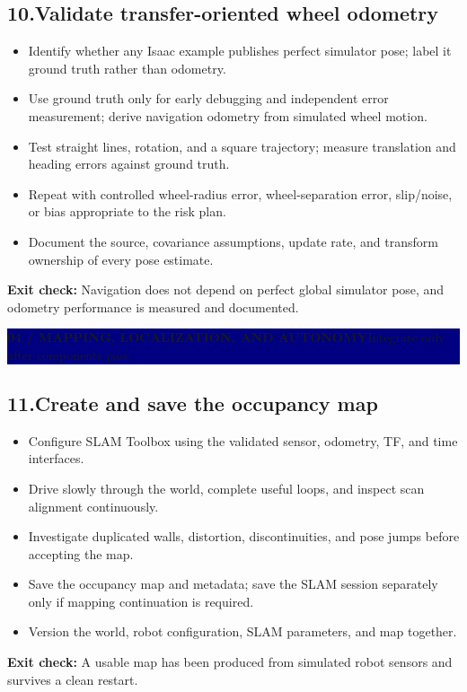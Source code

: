 \documentclass[10pt,a4paper]{article}
\newcommand{\cb}{\(\square\)}
\newcommand{\exitcheck}[1]{\vspace{2pt}\colorbox{PaleTeal}{\parbox{0.965\linewidth}{\textbf{Exit check:} #1}}}
\newcommand{\workstep}[2]{\subsection{\texorpdfstring{#1\quad #2}{#1\ #2}}}
\newcommand{\stagebanner}[2]{%
  \vspace{2pt}
  \noindent\colorbox{Navy}{\parbox{0.965\linewidth}{\color{white}\textbf{#1}\hfill #2}}
  \vspace{2pt}
}
\begin{document}
\workstep{10.}{Validate transfer-oriented wheel odometry}
\begin{itemize}
  \item[\cb] Identify whether any Isaac example publishes perfect simulator pose; label it ground truth rather than odometry.
  \item[\cb] Use ground truth only for early debugging and independent error measurement; derive navigation odometry from simulated wheel motion.
  \item[\cb] Test straight lines, rotation, and a square trajectory; measure translation and heading errors against ground truth.
  \item[\cb] Repeat with controlled wheel-radius error, wheel-separation error, slip/noise, or bias appropriate to the risk plan.
  \item[\cb] Document the source, covariance assumptions, update rate, and transform ownership of every pose estimate.
\end{itemize}
\exitcheck{Navigation does not depend on perfect global simulator pose, and odometry performance is measured and documented.}

\newpage
\stagebanner{04 / MAPPING, LOCALIZATION, AND AUTONOMY}{Integrate only after components pass}

\workstep{11.}{Create and save the occupancy map}
\begin{itemize}
  \item[\cb] Configure SLAM Toolbox using the validated sensor, odometry, TF, and time interfaces.
  \item[\cb] Drive slowly through the world, complete useful loops, and inspect scan alignment continuously.
  \item[\cb] Investigate duplicated walls, distortion, discontinuities, and pose jumps before accepting the map.
  \item[\cb] Save the occupancy map and metadata; save the SLAM session separately only if mapping continuation is required.
  \item[\cb] Version the world, robot configuration, SLAM parameters, and map together.
\end{itemize}
\exitcheck{A usable map has been produced from simulated robot sensors and survives a clean restart.}
\end{document}
